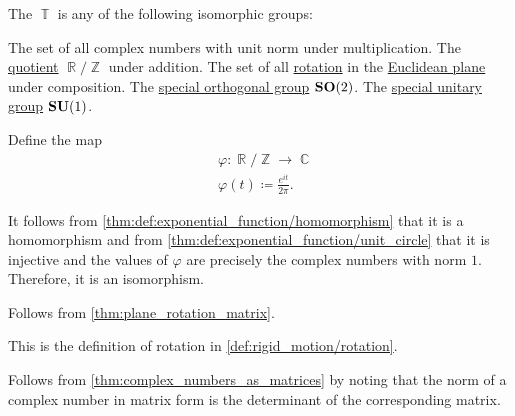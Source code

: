\begin{definition}\label{def:circle_group}\mimprovised
  The  \( \BbbT \) is any of the following isomorphic groups:
  \begin{thmenum}
     The set of all complex numbers with unit norm under multiplication.
     The \hyperref[def:group/quotient]{quotient} \( \BbbR / \BbbZ \) under addition.
     The set of all \hyperref[def:rigid_motion/rotation]{rotation} in the \hyperref[def:euclidean_plane]{Euclidean plane} under composition.
     The \hyperref[def:unitary_groups]{special orthogonal group} \( \grp{SO}(2) \).
     The \hyperref[def:unitary_groups]{special unitary group} \( \grp{SU}(1) \).
  \end{thmenum}
\end{definition}
\begin{defproof}
   Define the map
  \begin{equation*}
    \begin{aligned}
      &\varphi: \BbbR / \BbbZ \to \BbbC \\
      &\varphi(t) \coloneqq \frac {e^{it}} {2\pi}.
    \end{aligned}
  \end{equation*}

  It follows from \cref{thm:def:exponential_function/homomorphism} that it is a homomorphism and from \cref{thm:def:exponential_function/unit_circle} that it is injective and the values of \( \varphi \) are precisely the complex numbers with norm \( 1 \). Therefore, it is an isomorphism.

   Follows from \cref{thm:plane_rotation_matrix}.

   This is the definition of rotation in \cref{def:rigid_motion/rotation}.

   Follows from \cref{thm:complex_numbers_as_matrices} by noting that the norm of a complex number in matrix form is the determinant of the corresponding matrix.
\end{defproof}

